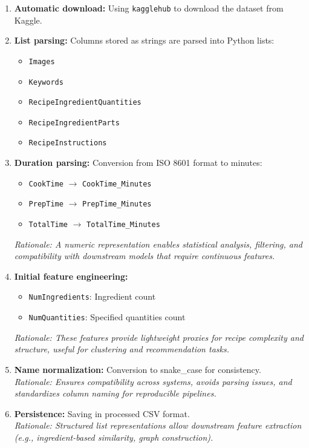 \documentclass[11pt,a4paper]{article}
\begin{document}
\begin{enumerate}
    \item \textbf{Automatic download:} Using \texttt{kagglehub} to download the dataset from Kaggle.

    \item \textbf{List parsing:} Columns stored as strings are parsed into Python lists:
    \begin{itemize}
        \item \texttt{Images}
        \item \texttt{Keywords}
        \item \texttt{RecipeIngredientQuantities}
        \item \texttt{RecipeIngredientParts}
        \item \texttt{RecipeInstructions}
    \end{itemize}

    \item \textbf{Duration parsing:} Conversion from ISO 8601 format to minutes:
    \begin{itemize}
        \item \texttt{CookTime} $\rightarrow$ \texttt{CookTime\_Minutes}
        \item \texttt{PrepTime} $\rightarrow$ \texttt{PrepTime\_Minutes}
        \item \texttt{TotalTime} $\rightarrow$ \texttt{TotalTime\_Minutes}
    \end{itemize}
    \textit{Rationale: A numeric representation enables statistical analysis, filtering, and compatibility with downstream models that require continuous features.}

    \item \textbf{Initial feature engineering:}
    \begin{itemize}
        \item \texttt{NumIngredients}: Ingredient count
        \item \texttt{NumQuantities}: Specified quantities count
    \end{itemize}
    \textit{Rationale: These features provide lightweight proxies for recipe complexity and structure, useful for clustering and recommendation tasks.}

    \item \textbf{Name normalization:} Conversion to snake\_case for consistency.\\
    \textit{Rationale: Ensures compatibility across systems, avoids parsing issues, and standardizes column naming for reproducible pipelines.}

    \item \textbf{Persistence:} Saving in processed CSV format.\\
    \textit{Rationale: Structured list representations allow downstream feature extraction (e.g., ingredient-based similarity, graph construction).}
\end{enumerate}
\end{document}
